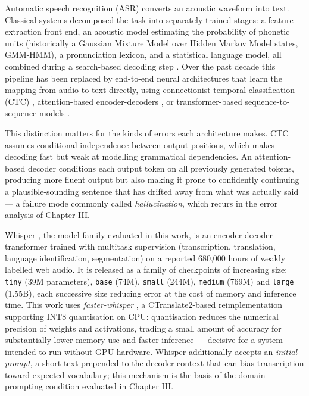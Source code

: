 \documentclass[12pt]{report}
\begin{document}
Automatic speech recognition (ASR) converts an acoustic waveform into text. Classical systems decomposed the task into separately trained stages: a feature-extraction front end, an acoustic model estimating the probability of phonetic units (historically a Gaussian Mixture Model over Hidden Markov Model states, GMM-HMM), a pronunciation lexicon, and a statistical language model, all combined during a search-based decoding step \cite{li2014overview}. Over the past decade this pipeline has been replaced by end-to-end neural architectures that learn the mapping from audio to text directly, using connectionist temporal classification (CTC) \cite{graves2012sequence}, attention-based encoder-decoders \cite{bahdanau2016end}, or transformer-based sequence-to-sequence models \cite{vaswani2017attention}.

This distinction matters for the kinds of errors each architecture makes. CTC assumes conditional independence between output positions, which makes decoding fast but weak at modelling grammatical dependencies. An attention-based decoder conditions each output token on all previously generated tokens, producing more fluent output but also making it prone to confidently continuing a plausible-sounding sentence that has drifted away from what was actually said --- a failure mode commonly called \textit{hallucination}, which recurs in the error analysis of Chapter III.

Whisper \cite{radford2023robust}, the model family evaluated in this work, is an encoder-decoder transformer trained with multitask supervision (transcription, translation, language identification, segmentation) on a reported 680{,}000 hours of weakly labelled web audio. It is released as a family of checkpoints of increasing size: \texttt{tiny} (39M parameters), \texttt{base} (74M), \texttt{small} (244M), \texttt{medium} (769M) and \texttt{large} (1.55B), each successive size reducing error at the cost of memory and inference time. This work uses \textit{faster-whisper} \cite{fasterwhisper2023}, a CTranslate2-based reimplementation supporting INT8 quantisation on CPU: quantisation reduces the numerical precision of weights and activations, trading a small amount of accuracy for substantially lower memory use and faster inference --- decisive for a system intended to run without GPU hardware. Whisper additionally accepts an \textit{initial prompt}, a short text prepended to the decoder context that can bias transcription toward expected vocabulary; this mechanism is the basis of the domain-prompting condition evaluated in Chapter III.
\end{document}
